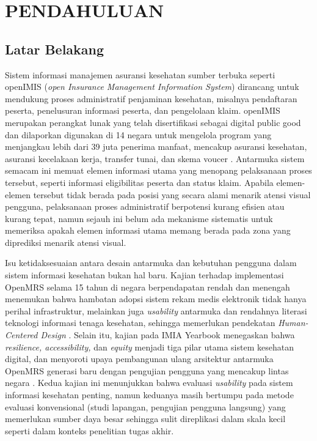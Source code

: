\chapter{PENDAHULUAN}

\section{Latar Belakang}


Sistem informasi manajemen asuransi kesehatan sumber terbuka seperti openIMIS (\textit{open Insurance Management Information System}) dirancang untuk mendukung proses administratif penjaminan kesehatan, misalnya pendaftaran peserta, penelusuran informasi peserta, dan pengelolaan klaim. openIMIS merupakan perangkat lunak yang telah disertifikasi sebagai digital public good dan dilaporkan digunakan di 14 negara untuk mengelola program yang menjangkau lebih dari 39 juta penerima manfaat, mencakup asuransi kesehatan, asuransi kecelakaan kerja, transfer tunai, dan skema voucer \citet{openimis2026}. Antarmuka sistem semacam ini memuat elemen informasi utama yang menopang pelaksanaan proses tersebut, seperti informasi eligibilitas peserta dan status klaim. Apabila elemen-elemen tersebut tidak berada pada posisi yang secara alami menarik atensi visual pengguna, pelaksanaan proses administratif berpotensi kurang efisien atau kurang tepat, namun sejauh ini belum ada mekanisme sistematis untuk memeriksa apakah elemen informasi utama memang berada pada zona yang diprediksi menarik atensi visual.

Isu ketidaksesuaian antara desain antarmuka dan kebutuhan pengguna dalam sistem informasi kesehatan bukan hal baru. Kajian terhadap implementasi OpenMRS selama 15 tahun di negara berpendapatan rendah dan menengah menemukan bahwa hambatan adopsi sistem rekam medis elektronik tidak hanya perihal infrastruktur, melainkan juga \textit{usability} antarmuka dan rendahnya literasi teknologi informasi tenaga kesehatan, sehingga memerlukan pendekatan \textit{Human-Centered Design} \citep{verma2021openmrs}. Selain itu, kajian pada IMIA Yearbook menegaskan bahwa \textit{resilience, accessibility,} dan \textit{equity} menjadi tiga pilar utama sistem kesehatan digital, dan menyoroti upaya pembangunan ulang arsitektur antarmuka OpenMRS generasi baru dengan pengujian pengguna yang mencakup lintas negara \citep{paton2022open}. Kedua kajian ini menunjukkan bahwa evaluasi \textit{usability} pada sistem informasi kesehatan penting, namun keduanya masih bertumpu pada metode evaluasi konvensional (studi lapangan, pengujian pengguna langsung) yang memerlukan sumber daya besar sehingga sulit direplikasi dalam skala kecil seperti dalam konteks penelitian tugas akhir.

